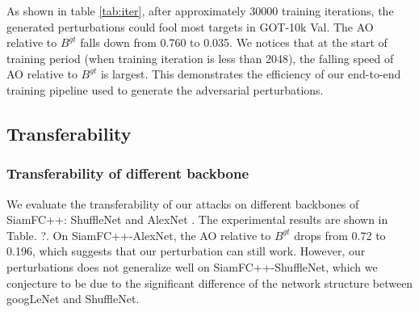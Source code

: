 \documentclass{article}
\begin{document}
As shown in table \ref{tab:iter}, after approximately 30000 training iterations, the generated perturbations could fool most targets in GOT-10k Val. The AO relative to $B^{gt}$ falls down from 0.760 to 0.035. We notices that at the start of training period (when training iteration is less than 2048), the falling speed of AO relative to $B^{gt}$ is largest. This demonstrates the efficiency of our end-to-end training pipeline used to generate the adversarial perturbations.

\subsection{Transferability}

\subsubsection{Transferability of different backbone}

We evaluate the transferability of our attacks on different backbones of SiamFC++: ShuffleNet \cite{ShuffleNet} and AlexNet \cite{AlexNet}.
The experimental results are shown in Table. ?. On SiamFC++-AlexNet, the AO relative to $B^{gt}$ drops from 0.72 to 0.196, which suggests that our perturbation can still work. However, our perturbations does not generalize well on SiamFC++-ShuffleNet, which we conjecture to be due to the significant difference of the network structure between googLeNet and ShuffleNet.

\begin{table}[ht]
\begin{center}
\end{center}
\caption{Different backbone}
\end{table}
\end{document}
